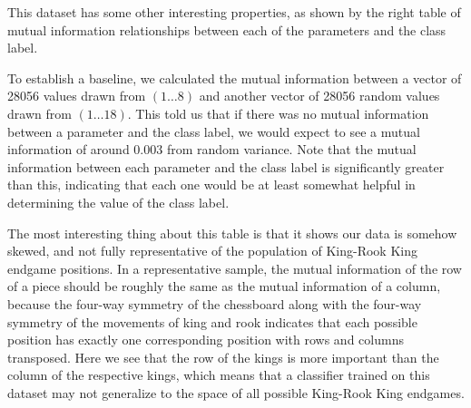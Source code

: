 \documentclass[fleqn]{article}
\begin{document}
%
This dataset has some other interesting properties, as shown by the right table of mutual information relationships between each of the parameters and the class label.

To establish a baseline, we calculated the mutual information between a vector of 28056 values drawn from $(1 \dots 8)$ and another vector of 28056 random values drawn from $(1 \dots 18)$. This told us that if there was no mutual information between a parameter and the class label, we would expect to see a mutual information of around $0.003$ from random variance. Note that the mutual information between each parameter and the class label is significantly greater than this, indicating that each one would be at least somewhat helpful in determining the value of the class label.

The most interesting thing about this table is that it shows our data is somehow skewed, and not fully representative of the population of King-Rook King endgame positions. In a representative sample, the mutual information of the row of a piece should be roughly the same as the mutual information of a column, because the four-way symmetry of the chessboard along with the four-way symmetry of the movements of king and rook indicates that each possible position has exactly one corresponding position with rows and columns transposed. Here we see that the row of the kings is more important than the column of the respective kings, which means that a classifier trained on this dataset may not generalize to the space of all possible King-Rook King endgames.
\end{document}
